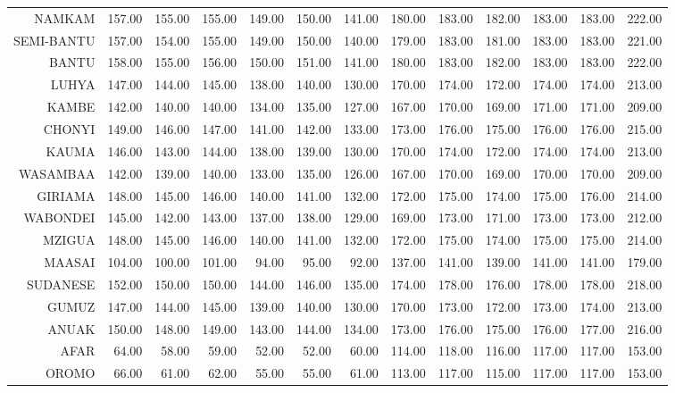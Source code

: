 \begin{longtable}{rrrrrrrrrrrrr}
  NAMKAM & 157.00 & 155.00 & 155.00 & 149.00 & 150.00 & 141.00 & 180.00 & 183.00 & 182.00 & 183.00 & 183.00 & 222.00 \\ 
  SEMI-BANTU & 157.00 & 154.00 & 155.00 & 149.00 & 150.00 & 140.00 & 179.00 & 183.00 & 181.00 & 183.00 & 183.00 & 221.00 \\ 
  BANTU & 158.00 & 155.00 & 156.00 & 150.00 & 151.00 & 141.00 & 180.00 & 183.00 & 182.00 & 183.00 & 183.00 & 222.00 \\ 
   \hline 
LUHYA & 147.00 & 144.00 & 145.00 & 138.00 & 140.00 & 130.00 & 170.00 & 174.00 & 172.00 & 174.00 & 174.00 & 213.00 \\ 
  KAMBE & 142.00 & 140.00 & 140.00 & 134.00 & 135.00 & 127.00 & 167.00 & 170.00 & 169.00 & 171.00 & 171.00 & 209.00 \\ 
  CHONYI & 149.00 & 146.00 & 147.00 & 141.00 & 142.00 & 133.00 & 173.00 & 176.00 & 175.00 & 176.00 & 176.00 & 215.00 \\ 
  KAUMA & 146.00 & 143.00 & 144.00 & 138.00 & 139.00 & 130.00 & 170.00 & 174.00 & 172.00 & 174.00 & 174.00 & 213.00 \\ 
  WASAMBAA & 142.00 & 139.00 & 140.00 & 133.00 & 135.00 & 126.00 & 167.00 & 170.00 & 169.00 & 170.00 & 170.00 & 209.00 \\ 
  GIRIAMA & 148.00 & 145.00 & 146.00 & 140.00 & 141.00 & 132.00 & 172.00 & 175.00 & 174.00 & 175.00 & 176.00 & 214.00 \\ 
  WABONDEI & 145.00 & 142.00 & 143.00 & 137.00 & 138.00 & 129.00 & 169.00 & 173.00 & 171.00 & 173.00 & 173.00 & 212.00 \\ 
  MZIGUA & 148.00 & 145.00 & 146.00 & 140.00 & 141.00 & 132.00 & 172.00 & 175.00 & 174.00 & 175.00 & 175.00 & 214.00 \\ 
   \hline 
MAASAI & 104.00 & 100.00 & 101.00 & 94.00 & 95.00 & 92.00 & 137.00 & 141.00 & 139.00 & 141.00 & 141.00 & 179.00 \\ 
  SUDANESE & 152.00 & 150.00 & 150.00 & 144.00 & 146.00 & 135.00 & 174.00 & 178.00 & 176.00 & 178.00 & 178.00 & 218.00 \\ 
  GUMUZ & 147.00 & 144.00 & 145.00 & 139.00 & 140.00 & 130.00 & 170.00 & 173.00 & 172.00 & 173.00 & 174.00 & 213.00 \\ 
  ANUAK & 150.00 & 148.00 & 149.00 & 143.00 & 144.00 & 134.00 & 173.00 & 176.00 & 175.00 & 176.00 & 177.00 & 216.00 \\ 
   \hline 
AFAR & 64.00 & 58.00 & 59.00 & 52.00 & 52.00 & 60.00 & 114.00 & 118.00 & 116.00 & 117.00 & 117.00 & 153.00 \\ 
  OROMO & 66.00 & 61.00 & 62.00 & 55.00 & 55.00 & 61.00 & 113.00 & 117.00 & 115.00 & 117.00 & 117.00 & 153.00 \\ 

\end{longtable}
